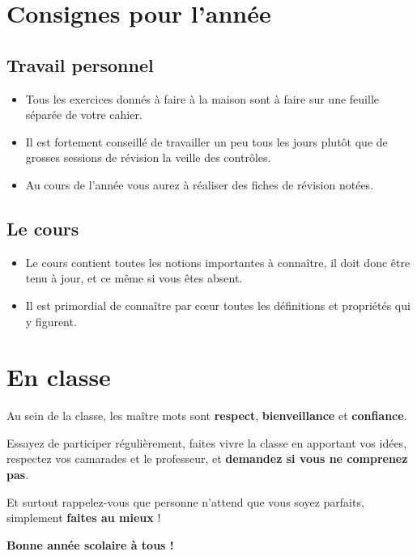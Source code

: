 \documentclass[oneside,12pt]{article}          %
\begin{document}
\section{Consignes pour l'année}

\subsection*{Travail personnel}
\begin{itemize}[label=$\bullet$]
	\item Tous les exercices donnés à faire à la maison sont à faire sur une feuille séparée de votre cahier.
	\item Il est fortement conseillé de travailler un peu tous les jours plutôt que de grosses sessions de révision la veille des contrôles.
	\item Au cours de l'année vous aurez à réaliser des fiches de révision notées.
\end{itemize}

\subsection*{Le cours}
\begin{itemize}[label=$\bullet$]
	\item Le cours contient toutes les notions importantes à connaître, il doit donc être tenu à jour, et ce même si vous êtes absent.
	\item Il est primordial de connaître par cœur toutes les définitions et propriétés qui y figurent.
\end{itemize}



\section{En classe}

Au sein de la classe, les maître mots sont \textbf{respect}, \textbf{bienveillance} et \textbf{confiance}.

Essayez de participer régulièrement, faites vivre la classe en apportant vos idées, respectez vos camarades et le professeur, et \textbf{demandez si vous ne comprenez pas}.

Et surtout rappelez-vous que personne n'attend que vous soyez parfaits, simplement \textbf{faites au mieux} !

\vspace{2cm}

\begin{center}
	\textbf{Bonne année scolaire à tous !}
\end{center}
\end{document}
